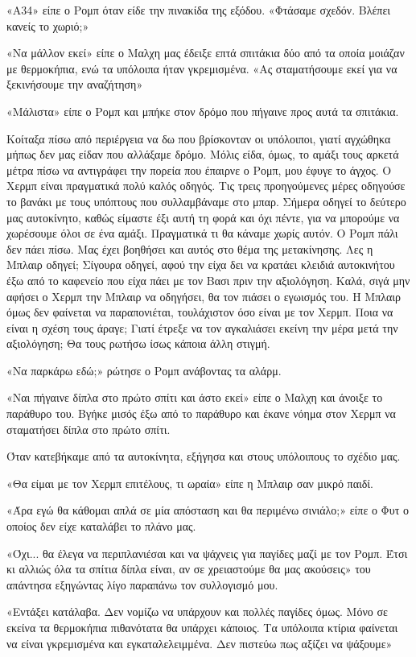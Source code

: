 \documentclass[12pt,twoside, openany]{book}
\begin{document}
«Α34» είπε ο Ρομπ όταν είδε την πινακίδα της εξόδου. «Φτάσαμε σχεδόν. Βλέπει κανείς το χωριό;»

«Να μάλλον εκεί» είπε ο Μαλχη μας έδειξε επτά σπιτάκια δύο από τα οποία μοιάζαν με θερμοκήπια, ενώ τα υπόλοιπα ήταν γκρεμισμένα. «Ας σταματήσουμε εκεί για να ξεκινήσουμε την αναζήτηση»

«Μάλιστα» είπε ο Ρομπ και μπήκε στον δρόμο που πήγαινε προς αυτά τα σπιτάκια.

Κοίταξα πίσω από περιέργεια να δω που βρίσκονταν οι υπόλοιποι, γιατί αγχώθηκα μήπως δεν μας είδαν που αλλάξαμε δρόμο. Μόλις είδα, όμως, το αμάξι τους αρκετά μέτρα πίσω να αντιγράφει την πορεία που έπαιρνε ο Ρομπ, μου έφυγε το άγχος. Ο Χερμπ είναι πραγματικά πολύ καλός οδηγός. Τις τρεις προηγούμενες μέρες οδηγούσε το βανάκι με τους υπόπτους που συλλαμβάναμε στο μπαρ. Σήμερα οδηγεί το δεύτερο μας αυτοκίνητο, καθώς είμαστε έξι αυτή τη φορά και όχι πέντε, για να μπορούμε να χωρέσουμε όλοι σε ένα αμάξι. Πραγματικά τι θα κάναμε χωρίς αυτόν. Ο Ρομπ πάλι δεν πάει πίσω. Μας έχει βοηθήσει και αυτός στο θέμα της μετακίνησης. Λες η Μπλαιρ οδηγεί; Σίγουρα οδηγεί, αφού την είχα δει να κρατάει κλειδιά αυτοκινήτου έξω από το καφενείο που είχα πάει με τον Βασι πριν την αξιολόγηση. Καλά, σιγά μην αφήσει ο Χερμπ την Μπλαιρ να οδηγήσει, θα τον πιάσει ο εγωισμός του. Η Μπλαιρ όμως δεν φαίνεται να παραπονιέται, τουλάχιστον όσο είναι με τον Χερμπ. Ποια να είναι η σχέση τους άραγε; Γιατί έτρεξε να τον αγκαλιάσει εκείνη την μέρα μετά την αξιολόγηση; Θα τους ρωτήσω ίσως κάποια άλλη στιγμή.

«Να παρκάρω εδώ;» ρώτησε ο Ρομπ ανάβοντας τα αλάρμ.

«Ναι πήγαινε δίπλα στο πρώτο σπίτι και άστο εκεί» είπε ο Μαλχη και άνοιξε το παράθυρο του. Βγήκε μισός έξω από το παράθυρο και έκανε νόημα στον Χερμπ να σταματήσει δίπλα στο πρώτο σπίτι.

Όταν κατεβήκαμε από τα αυτοκίνητα, εξήγησα και στους υπόλοιπους το σχέδιο μας.

«Θα είμαι με τον Χερμπ επιτέλους, τι ωραία» είπε η Μπλαιρ σαν μικρό παιδί.

«Άρα εγώ θα κάθομαι απλά σε μία απόσταση και θα περιμένω σινιάλο;» είπε ο Φυτ ο οποίος δεν είχε καταλάβει το πλάνο μας.

«Όχι... θα έλεγα να περιπλανιέσαι και να ψάχνεις για παγίδες μαζί με τον Ρομπ. Έτσι κι αλλιώς όλα τα σπίτια δίπλα είναι, αν σε χρειαστούμε θα μας ακούσεις» του απάντησα εξηγώντας λίγο παραπάνω τον συλλογισμό μου.

«Εντάξει κατάλαβα. Δεν νομίζω να υπάρχουν και πολλές παγίδες όμως. Μόνο σε εκείνα τα θερμοκήπια πιθανότατα θα υπάρχει κάποιος. Τα υπόλοιπα κτίρια φαίνεται να είναι γκρεμισμένα και εγκαταλελειμμένα. Δεν πιστεύω πως αξίζει να ψάξουμε»
\end{document}
